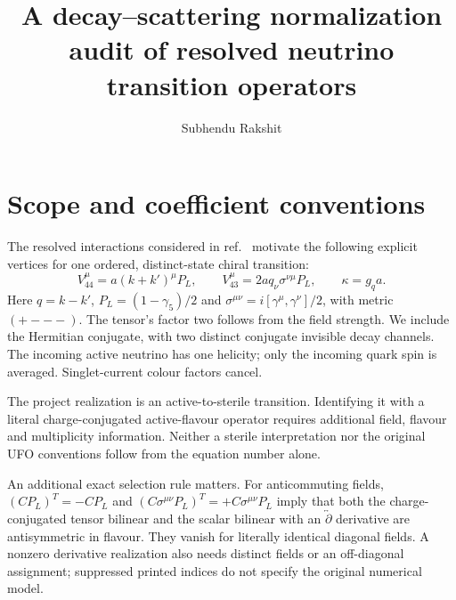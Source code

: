 \documentclass[11pt,a4paper]{article}
\title{A decay--scattering normalization audit of resolved neutrino transition operators}
\author{Subhendu Rakshit}
\newcommand{\PL}{P_L}
\begin{document}
\maketitle

\section{Scope and coefficient conventions}
The resolved interactions considered in ref.~\cite{PKR} motivate the following
explicit vertices for one ordered, distinct-state chiral transition:
\begin{equation}
 V_{44}^\mu=a(k+k')^\mu\PL,\qquad
 V_{43}^\mu=2a q_\nu\sigma^{\nu\mu}\PL,\qquad \kappa=g_q a.
\end{equation}
Here $q=k-k'$, $\PL=(1-\gamma_5)/2$ and
$\sigma^{\mu\nu}=i[\gamma^\mu,\gamma^\nu]/2$, with metric $(+---)$.
The tensor's factor two follows from the field strength. We include the
Hermitian conjugate, with two distinct conjugate invisible decay channels.
The incoming active neutrino has one helicity; only the incoming quark spin
is averaged. Singlet-current colour factors cancel.

The project realization is an active-to-sterile transition. Identifying it
with a literal charge-conjugated active-flavour operator requires additional
field, flavour and multiplicity information. Neither a sterile interpretation
nor the original UFO conventions follow from the equation number alone.

An additional exact selection rule matters. For anticommuting fields,
$(C\PL)^T=-C\PL$ and
$(C\sigma^{\mu\nu}\PL)^T=+C\sigma^{\mu\nu}\PL$ imply that both the
charge-conjugated tensor bilinear and the scalar bilinear with an
$\overleftrightarrow{\partial}$ derivative are antisymmetric in flavour.
They vanish for literally identical diagonal fields. A nonzero derivative
realization also needs distinct fields or an off-diagonal assignment;
suppressed printed indices do not specify the original numerical model.
\end{document}
